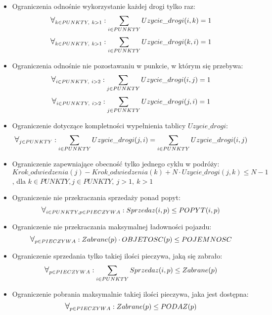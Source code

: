 \documentclass[]{article}
\begin{document}
\begin{itemize}
	\item Ograniczenia odnośnie wykorzystanie każdej drogi tylko raz:\\
		\[ \mathlarger{\forall}_{k \in PUNKTY,~k > 1}: \sum_{i \in PUNKTY} Uzycie\_drogi(i,k) = 1 \]
		\[ \mathlarger{\forall}_{k \in PUNKTY,~k > 1}: \sum_{i \in PUNKTY} Uzycie\_drogi(k,i) = 1 \]

	\item Ograniczenia odnośnie nie pozostawaniu w punkcie, w którym się przebywa:\\
		\[ \mathlarger{\forall}_{i \in PUNKTY,~i > 2}: \sum_{j \in PUNKTY} Uzycie\_drogi(i,j) = 1 \]
		\[ \mathlarger{\forall}_{i \in PUNKTY,~i > 2}: \sum_{j \in PUNKTY} Uzycie\_drogi(j,i) = 1 \]

	\item Ograniczenie dotyczące kompletności wypełnienia tablicy $Uzycie\_drogi$:\\
		\[ \mathlarger{\forall}_{j \in PUNKTY}: \sum_{i \in PUNKTY} Uzycie\_drogi(j,i) = \sum_{i \in PUNKTY} Uzycie\_drogi(i,j) \]

	\item Ograniczenie zapewniające obecność tylko jednego cyklu w podróży:\\
		\[ Krok\_odwiedzenia(j) - Krok\_odwiedzenia(k) + N \cdot Uzycie\_drogi(j,k) \leq N-1 \], dla ${k \in PUNKTY, j \in PUNKTY,~j > 1,~k > 1}$

	\item Ograniczenie nie przekraczania sprzedaży ponad popyt:\\
		\[ \mathlarger{\forall}_{i \in PUNKTY, p \in PIECZYWA}: Sprzedaz(i,p) \leq POPYT(i,p) \]

	\item Ograniczenie nie przekraczania maksymalnej ładowności pojazdu:\\
		\[ \mathlarger{\forall}_{p \in PIECZYWA}: Zabrane(p) \cdot OBJETOSC(p) \leq POJEMNOSC \]

	\item Ograniczenie sprzedania tylko takiej ilości pieczywa, jaką się zabrało:\\
		\[ \mathlarger{\forall}_{p \in PIECZYWA}: \sum_{i \in PUNKTY} Sprzedaz(i,p) \leq Zabrane(p) \]

	\item Ograniczenie pobrania maksymalnie takiej ilości pieczywa, jaka jest dostępna:\\
		\[ \mathlarger{\forall}_{p \in PIECZYWA}: Zabrane(p) \leq PODAZ(p) \]

\end{itemize}
\end{document}

